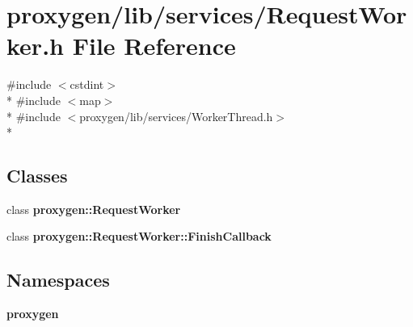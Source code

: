 \section{proxygen/lib/services/\+Request\+Worker.h File Reference}
\label{RequestWorker_8h}
{\ttfamily \#include $<$cstdint$>$}\\*
{\ttfamily \#include $<$map$>$}\\*
{\ttfamily \#include $<$proxygen/lib/services/\+Worker\+Thread.\+h$>$}\\*
\subsection*{Classes}
\begin{DoxyCompactItemize}
\item 
class {\bf proxygen\+::\+Request\+Worker}
\item 
class {\bf proxygen\+::\+Request\+Worker\+::\+Finish\+Callback}
\end{DoxyCompactItemize}
\subsection*{Namespaces}
\begin{DoxyCompactItemize}
\item 
 {\bf proxygen}
\end{DoxyCompactItemize}
